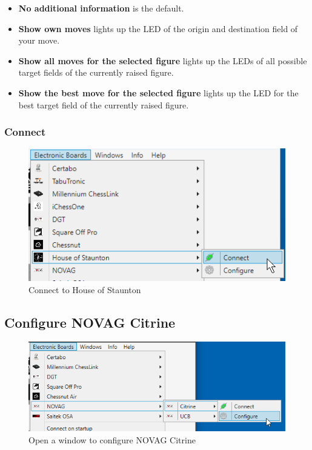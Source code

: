 \documentclass[11pt,a4paper]{article}
\begin{document}
\begin{itemize}
	\item \textbf{No additional information} is the default.
	\item \textbf{Show own moves} lights up the LED of the origin and destination field of your move.
	\item \textbf{Show all moves for the selected figure} lights up the LEDs of all possible target fields of the currently raised figure.
	\item \textbf{Show the best move for the selected figure} lights up the LED for the best target field of the currently raised figure.
\end{itemize}

\subsubsection{Connect}
\begin{figure}[H]
	\centering
	\includegraphics[scale=1.0]{HOS3.png}
	\caption{Connect to House of Staunton}
	\label{fig:HOS3}
\end{figure}

\subsection{Configure NOVAG Citrine} \label{ConfigureNovagCitrine}

\begin{figure}[H]
	\centering
	\includegraphics[scale=0.8]{NovagCitrine1.png}
	\caption{Open a window to configure NOVAG Citrine }
	\label{fig:NovagCtrine1}
\end{figure}
\end{document}
